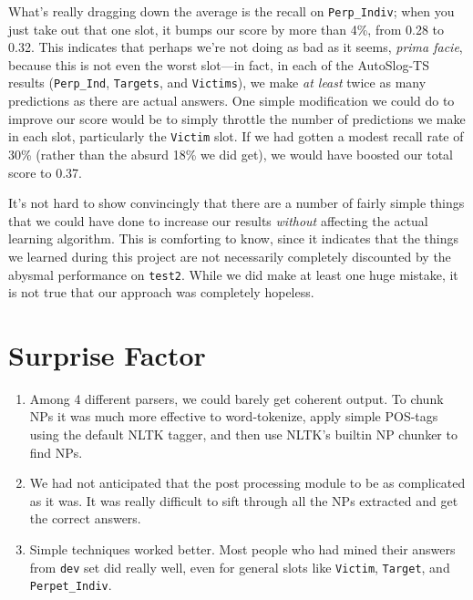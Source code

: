 \documentclass[11pt]{myclass}
\begin{document}
What's really dragging down the average is the recall on \texttt{Perp\_Indiv}; when you just take out that one slot, it bumps our score by more than 4\%, from 0.28 to 0.32. This indicates that perhaps we're not doing as bad as it seems, \textit{prima facie}, because this is not even the worst slot---in fact, in each of the AutoSlog-TS results (\texttt{Perp\_Ind}, \texttt{Targets}, and \texttt{Victims}), we make \textit{at least} twice as many predictions as there are actual answers. One simple modification we could do to improve our score would be to simply throttle the number of predictions we make in each slot, particularly the \texttt{Victim} slot. If we had gotten a modest recall rate of 30\% (rather than the absurd 18\% we did get), we would have boosted our total score to 0.37.

It's not hard to show convincingly that there are a number of fairly simple things that we could have done to increase our results \textit{without} affecting the actual learning algorithm. This is comforting to know, since it indicates that the things we learned during this project are not necessarily completely discounted by the abysmal performance on \texttt{test2}. While we did make at least one huge mistake, it is not true that our approach was completely hopeless.




\section{Surprise Factor}

\begin{enumerate}

\item Among 4 different parsers, we could barely get coherent output. To chunk NPs it was much more effective to word-tokenize, apply simple POS-tags using the default NLTK tagger, and then use NLTK's builtin NP chunker to find NPs.

\item We had not anticipated that the post processing module to be as complicated as it was. It was really difficult to sift through all the NPs extracted and get the correct answers.

\item Simple techniques worked better. Most people who had mined their answers from \texttt{dev} set did really well, even for general slots like \texttt{Victim}, \texttt{Target}, and \texttt{Perpet\_Indiv}.

\end{enumerate}
\end{document}
